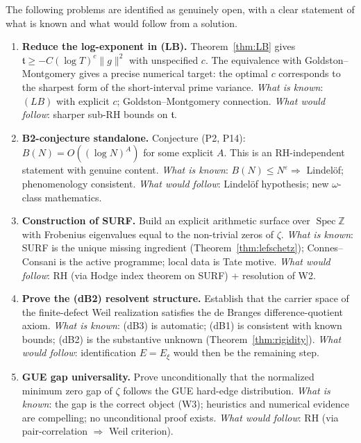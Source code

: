 \documentclass[11pt]{amsart}
\theoremstyle{definition}
\theoremstyle{remark}
\newcommand{\om}{\omega}
\newcommand{\eps}{\varepsilon}
\newcommand{\Spec}{\operatorname{Spec}}
\begin{document}
The following problems are identified as genuinely open, with a clear statement of
what is known and what would follow from a solution.

\begin{enumerate}[label=\textbf{OP\arabic*.}]

\item \textbf{Reduce the log-exponent in (LB).}
Theorem~\ref{thm:LB} gives $\mathfrak{t}\ge -C(\log T)^c\|g\|^2$ with unspecified $c$.
The equivalence with Goldston--Montgomery gives a precise numerical target: the optimal
$c$ corresponds to the sharpest form of the short-interval prime variance.
\emph{What is known}: $(LB)$ with explicit $c$; Goldston--Montgomery connection.
\emph{What would follow}: sharper sub-RH bounds on $\mathfrak{t}$.

\item \textbf{B2-conjecture standalone.}
Conjecture (P2, P14): $B(N) = O((\log N)^A)$ for some explicit $A$.
This is an RH-independent statement with genuine content.
\emph{What is known}: $B(N)\le N^\eps\Rightarrow$ Lindel\"of; phenomenology consistent.
\emph{What would follow}: Lindel\"of hypothesis; new $\om$-class mathematics.

\item \textbf{Construction of SURF.}
Build an explicit arithmetic surface over $\Spec\mathbb{Z}$ with Frobenius eigenvalues
equal to the non-trivial zeros of $\zeta$.
\emph{What is known}: SURF is the unique missing ingredient (Theorem~\ref{thm:lefschetz});
Connes--Consani is the active programme; local data is Tate motive.
\emph{What would follow}: RH (via Hodge index theorem on SURF) + resolution of W2.

\item \textbf{Prove the (dB2) resolvent structure.}
Establish that the carrier space of the finite-defect Weil realization satisfies
the de Branges difference-quotient axiom.
\emph{What is known}: (dB3) is automatic; (dB1) is consistent with known bounds;
(dB2) is the substantive unknown (Theorem~\ref{thm:rigidity}).
\emph{What would follow}: identification $E = E_\xi$ would then be the remaining step.

\item \textbf{GUE gap universality.}
Prove unconditionally that the normalized minimum zero gap of $\zeta$ follows
the GUE hard-edge distribution.
\emph{What is known}: the gap is the correct object (W3); heuristics and numerical
evidence are compelling; no unconditional proof exists.
\emph{What would follow}: RH (via pair-correlation $\Rightarrow$ Weil criterion).


\end{enumerate}
\end{document}
